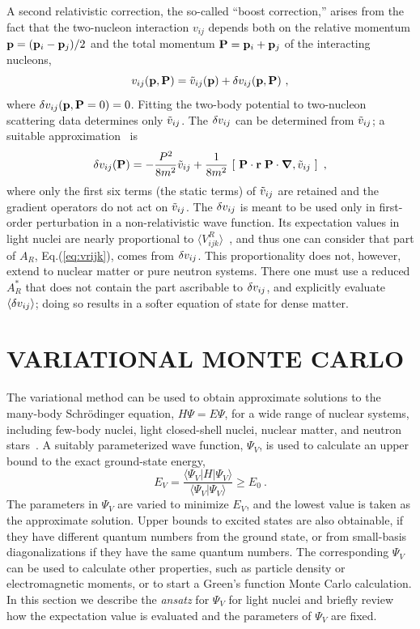 A second relativistic correction, the so-called ``boost correction,''
arises from the fact that the two-nucleon interaction $v_{ij}$
depends both on the relative momentum ${\bf p} = ({\bf p}_i - {\bf p}_j)/2$
and the total momentum ${\bf P} = {\bf p}_i + {\bf p}_j $ of the 
interacting nucleons,
\begin{equation}
v_{ij}({\bf p},{\bf P}) = \tilde{v}_{ij}({\bf p}) + \delta v_{ij}({\bf p},{\bf P}) \ ,
\label{eq:tvdv}
\end{equation}
where $\delta v_{ij}({\bf p},{\bf P}=0)=0$.  Fitting the two-body potential
to two-nucleon scattering data determines only $\tilde{v}_{ij}$.  The
$\delta v_{ij}$ can be determined from $\tilde{v}_{ij}$; a suitable 
approximation~\cite{FPA99,FPF95,F75} is
\begin{equation}
\delta{v_{ij}}({\bf P})=-\frac{P^2}{8m^2}\tilde{v}_{ij}+\frac{1}{8m^2}\,\left[\ {\bf P}
\cdot{\bf r}\;{\bf P}\cdot\mbox{\boldmath$\nabla$}, \tilde{v}_{ij}\ \right] \ ,
\label{eq:friar}
\end{equation}
where only the first six terms (the static terms) of $\tilde{v}_{ij}$ are retained
and the gradient operators do not act on $\tilde{v}_{ij}$.  The $\delta v_{ij}$
is meant to be used only in first-order perturbation in a 
non-relativistic wave function.  Its expectation values in light nuclei are 
nearly proportional to $\langle V^R_{ijk} \rangle$~\cite{PPWC01},
and thus one can consider that part of $A_R$, Eq.(\ref{eq:vrijk}), 
comes from $\delta v_{ij}$.
This proportionality does not, however, extend to nuclear matter or pure
neutron systems.  There one must use a reduced $A_R^*$ that does
not contain the part ascribable to $\delta v_{ij}$, and explicitly evaluate
$\langle \delta v_{ij} \rangle$; doing so results in a softer equation of state
for dense matter.

\section{VARIATIONAL MONTE CARLO}

The variational method can be used to obtain approximate solutions to the
many-body Schr\"{o}dinger equation, $H\Psi = E\Psi$, for a wide range of
nuclear systems, including few-body nuclei, light closed-shell nuclei,
nuclear matter, and neutron stars~\cite{W93}.
A suitably parameterized wave function, $\Psi_V$, is used to calculate an
upper bound to the exact ground-state energy,
\begin{equation}
   E_V = \frac{\langle \Psi_V | H | \Psi_V \rangle}
              {\langle \Psi_V   |   \Psi_V \rangle} \geq E_0 \ .
\label{eq:expect}
\end{equation}
The parameters in $\Psi_V$ are varied to minimize $E_V$, and the lowest value
is taken as the approximate solution.
Upper bounds to excited states are also obtainable, if they have different
quantum numbers from the ground state, or from small-basis diagonalizations
if they have the same quantum numbers.
The corresponding $\Psi_V$ can be used to calculate other properties,
such as particle density or electromagnetic moments, or to
start a Green's function Monte Carlo calculation.
In this section we describe the {\it ansatz} for $\Psi_V$ for light
nuclei and briefly review how the expectation value
is evaluated and the parameters of $\Psi_V$ are fixed.

